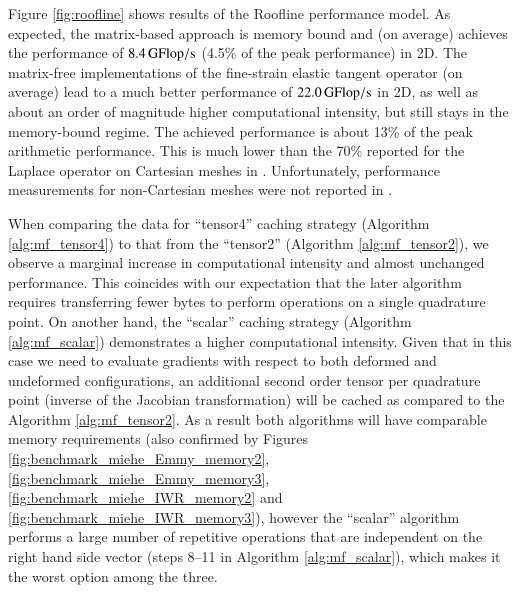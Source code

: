 \documentclass[times,doublespace]{nmeauth}
\begin{document}
{\color{red}
Figure \ref{fig:roofline} shows results of the Roofline performance model.
As expected, the matrix-based approach is memory bound and (on average) achieves the performance of $8.4\,\rm{GFlop/s}$ (4.5\% of the peak performance) in 2D.
The matrix-free implementations of the fine-strain elastic tangent operator (on average) lead to a much better performance of
$22.0\,\rm{GFlop/s}$ in 2D, as well as about an order of magnitude higher computational intensity, but still stays in the memory-bound regime.
The achieved performance is about 13\% of the peak arithmetic performance. This is much lower than the
70\% reported for the Laplace operator on Cartesian meshes in \cite{kronbichler12}.
Unfortunately, performance measurements for non-Cartesian meshes were not reported in \cite{kronbichler12}.

When comparing the data for ``tensor4'' caching strategy (Algorithm \ref{alg:mf_tensor4}) to that from the ``tensor2'' (Algorithm \ref{alg:mf_tensor2}),
we observe a marginal increase in computational intensity and almost unchanged performance.
This coincides with our expectation that the later algorithm requires transferring fewer bytes to perform operations on a single quadrature point.
On another hand, the ``scalar'' caching strategy (Algorithm \ref{alg:mf_scalar}) demonstrates a higher computational intensity.
Given that in this case we need to evaluate gradients with respect to both deformed and undeformed configurations, an additional
second order tensor per quadrature point (inverse of the Jacobian transformation) will be cached as compared to the Algorithm \ref{alg:mf_tensor2}.
As a result both algorithms will have comparable memory requirements (also confirmed by Figures \ref{fig:benchmark_miehe_Emmy_memory2}, \ref{fig:benchmark_miehe_Emmy_memory3}, \ref{fig:benchmark_miehe_IWR_memory2} and \ref{fig:benchmark_miehe_IWR_memory3}),
however the ``scalar'' algorithm performs a large number of repetitive operations that are
independent on the right hand side vector (steps 8--11 in Algorithm \ref{alg:mf_scalar}), which makes it the worst option among the three.

}
\end{document}
